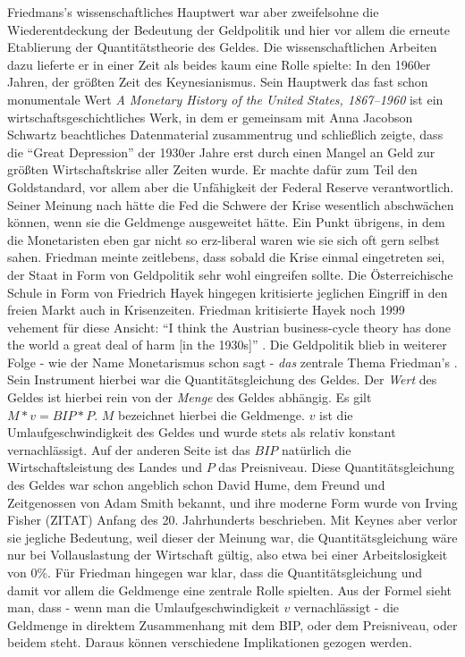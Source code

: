 Friedmans's wissenschaftliches Hauptwert war aber zweifelsohne die Wiederentdeckung der Bedeutung der Geldpolitik und hier vor allem die erneute Etablierung der Quantitätstheorie des Geldes. Die wissenschaftlichen Arbeiten dazu lieferte er in einer Zeit als beides kaum eine Rolle spielte: In den 1960er Jahren, der größten Zeit des Keynesianismus. Sein Hauptwerk das fast schon monumentale Wert \textit{A Monetary History of the United States, 1867–1960} ist ein wirtschaftsgeschichtliches Werk, in dem er gemeinsam mit Anna Jacobson Schwartz beachtliches Datenmaterial zusammentrug und schließlich zeigte, dass die "`Great Depression"' der 1930er Jahre erst durch einen Mangel an Geld zur größten Wirtschaftskrise aller Zeiten wurde. Er machte dafür zum Teil den Goldstandard, vor allem aber die Unfähigkeit der Federal Reserve verantwortlich. Seiner Meinung nach hätte die Fed die Schwere der Krise wesentlich abschwächen können, wenn sie die Geldmenge ausgeweitet hätte. Ein Punkt übrigens, in dem die Monetaristen eben gar nicht so erz-liberal waren wie sie sich oft gern selbst sahen. Friedman meinte zeitlebens, dass sobald die Krise einmal eingetreten sei, der Staat in Form von Geldpolitik sehr wohl eingreifen sollte. Die Österreichische Schule in Form von Friedrich Hayek hingegen kritisierte jeglichen Eingriff in den freien Markt auch in Krisenzeiten. Friedman kritisierte Hayek noch 1999 vehement für diese Ansicht: "`I think the Austrian business-cycle theory has done the world a great deal of harm [in the 1930s]"' \parencite{Epstein1999}.
Die Geldpolitik blieb in weiterer Folge - wie der Name Monetarismus schon sagt - \textit{das} zentrale Thema Friedman's \parencite{Friedman1968}. Sein Instrument hierbei war die Quantitätsgleichung des Geldes. Der \textit{Wert} des Geldes ist hierbei rein von der \textit{Menge} des Geldes abhängig. Es gilt $ M * v = BIP * P$. $M$ bezeichnet hierbei die Geldmenge. $v$ ist die Umlaufgeschwindigkeit des Geldes und wurde stets als relativ konstant vernachlässigt. Auf der anderen Seite ist das $BIP$ natürlich die Wirtschaftsleistung des Landes und $P$ das Preisniveau. Diese Quantitätsgleichung des Geldes war schon angeblich schon David Hume, dem Freund und Zeitgenossen von Adam Smith bekannt, und ihre moderne Form wurde von Irving Fisher (ZITAT) Anfang des 20. Jahrhunderts beschrieben. Mit Keynes aber verlor sie jegliche Bedeutung, weil dieser der Meinung war, die Quantitätsgleichung wäre nur bei Vollauslastung der Wirtschaft gültig, also etwa bei einer Arbeitslosigkeit von 0\%.
Für Friedman hingegen war klar, dass die Quantitätsgleichung und damit vor allem die Geldmenge eine zentrale Rolle spielten. Aus der Formel sieht man, dass - wenn man die Umlaufgeschwindigkeit $v$ vernachlässigt - die Geldmenge in direktem Zusammenhang mit dem BIP, oder dem Preisniveau, oder beidem steht. Daraus können verschiedene Implikationen gezogen werden. 

